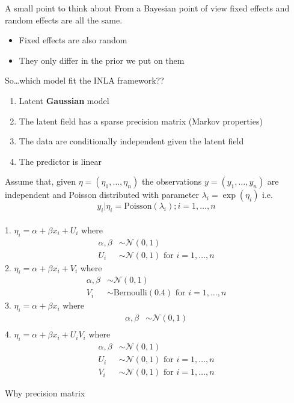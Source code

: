 \documentclass[
  ignorenonframetext,
]{beamer}
\providecommand{\tightlist}{%
  \setlength{\itemsep}{0pt}\setlength{\parskip}{0pt}}
\begin{document}
\begin{frame}{A small point to think about}
\protect\hypertarget{a-small-point-to-think-about}{}
From a Bayesian point of view fixed effects and random effects are all
the same.

\begin{itemize}
\tightlist
\item
  Fixed effects are also random
\item
  They only differ in the prior we put on them
\end{itemize}
\end{frame}

\begin{frame}{So\ldots which model fit the INLA framework??}
\protect\hypertarget{sowhich-model-fit-the-inla-framework}{}
\begin{enumerate}
\tightlist
\item
  Latent \textbf{Gaussian} model
\item
  The latent field has a sparse precision matrix (Markov properties)
\item
  The data are conditionally independent given the latent field
\item
  The predictor is linear
\end{enumerate}
\end{frame}

\begin{frame}{}
\protect\hypertarget{section}{}
\small

Assume that, given \(\eta = (\eta_1,\dots,\eta_n)\) the observations
\(y = (y_1,\dots,y_n)\) are independent and Poisson distributed with
parameter \(\lambda_ i = \exp(\eta_i)\) i.e. \[
y_i|\eta_i =\text{Poisson}(\lambda_i); i = 1,\dots,n
\]\\
1. \(\eta_i=\alpha+\beta x_i+U_i\) where \[
\begin{aligned}
\alpha,\beta & \sim\mathcal{N}(0,1)\\
U_i & \sim \mathcal{N}(0,1) \text{ for } i = 1,\dots,n
\end{aligned}
\] 2. \(\eta_i=\alpha+\beta x_i+V_i\) where \[
\begin{aligned}
\alpha,\beta & \sim\mathcal{N}(0,1)\\
V_i & \sim \text{Bernoulli}(0.4) \text{ for } i = 1,\dots,n
\end{aligned}
\] 3. \(\eta_i=\alpha+\beta x_i\) where \[
\begin{aligned}
\alpha,\beta & \sim\mathcal{N}(0,1)\\
\end{aligned}
\] 4. \(\eta_i=\alpha+\beta x_i + U_iV_i\) where \[
\begin{aligned}
\alpha,\beta & \sim\mathcal{N}(0,1)\\
U_i & \sim \mathcal{N}(0,1) \text{ for } i = 1,\dots,n\\
V_i & \sim \mathcal{N}(0,1) \text{ for } i = 1,\dots,n
\end{aligned}
\] \normalsize
\end{frame}

\begin{frame}{Why precision matrix}
\protect\hypertarget{why-precision-matrix}{}
\end{frame}
\end{document}
